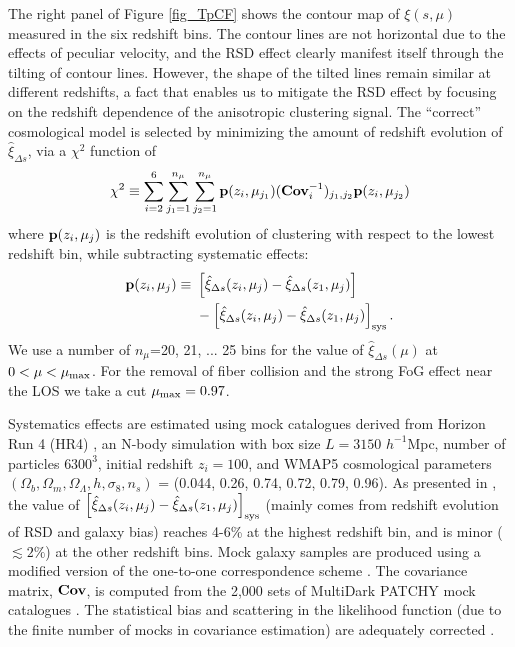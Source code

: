 \documentclass[iop]{emulateapj}
\begin{document}
The right panel of Figure \ref{fig_TpCF} shows the contour map of $\xi(s,\mu)$ measured in the six redshift bins.
The contour lines are not horizontal due to the effects of peculiar velocity,
and the RSD effect clearly manifest itself through the tilting of contour lines.
However, the shape of the tilted lines remain similar at different redshifts, a fact that enables us  to mitigate the RSD effect by focusing on the redshift dependence of the anisotropic clustering signal.
The ``correct'' cosmological model is selected by minimizing the amount of redshift evolution of $\hat\xi_{\Delta s}$,
via a $\chi^2$ function of 
\begin{equation}
 \chi^2\equiv \sum_{i=2}^{6} \sum_{j_1=1}^{n_{\mu}} \sum_{j_2=1}^{n_{\mu}} {\bf p}(z_i,\mu_{j_1}) ({\bf Cov}_{i}^{-1})_{j_1,j_2}  {\bf p}(z_i,\mu_{j_2})
\end{equation}
where ${\bf p}(z_i,\mu_{j})$ is the redshift evolution of clustering with respect to the lowest redshift bin,
while subtracting systematic effects:
\begin{eqnarray}
 {\bf p}(z_i,\mu_{j}) \equiv\ & \left[\hat\xi_{\Delta s}(z_i,\mu_j)-\hat\xi_{\Delta s}(z_1,\mu_j)\right] \\ \nonumber
 &- \left[\hat\xi_{\Delta s}(z_i,\mu_j)-\hat\xi_{\Delta s}(z_1,\mu_j)\right]_{\rm sys}.
\end{eqnarray}
We use a number of $n_{\mu}$=20, 21, ... 25 bins for the value of $\hat\xi_{\Delta s}(\mu)$ at $0<\mu<\mu_{\rm max}$.
For the removal of fiber collision and the strong FoG effect near the LOS we take a cut $\mu_{\rm max} = 0.97$.

Systematics effects are estimated using mock catalogues derived from Horizon Run 4 (HR4) \cite{HR4},
an N-body simulation with box size $L={3150}$ $h^{-1}$Mpc, number of particles $6300^3$,   
initial redshift $z_{i}=100$, and WMAP5\citep{komatsu2011} cosmological parameters 
$(\Omega_{b},\Omega_{m},\Omega_\Lambda,h,\sigma_8,n_s)$  = (0.044, 0.26, 0.74, 0.72, 0.79, 0.96). 
As presented in \cite{Li2016}, the value of $\left[\hat\xi_{\Delta s}(z_i,\mu_j)-\hat\xi_{\Delta s}(z_1,\mu_j)\right]_{\rm sys}$
(mainly comes from redshift evolution of RSD and galaxy bias)
reaches 4-6\% at the highest redshift bin,
and is minor ($\lesssim2\%$) at the other redshift bins.
Mock galaxy samples are produced using a modified version of the one-to-one correspondence scheme \citep{hong2016}. 
The covariance matrix, ${\bf Cov}$, is computed from the 2,000 sets of MultiDark PATCHY mock catalogues \citep{MDPATCHY}.
The statistical bias and scattering in the likelihood function (due to the finite number of mocks in covariance estimation) 
are adequately corrected \citep{Hartlap,Percival2014}.
\end{document}
